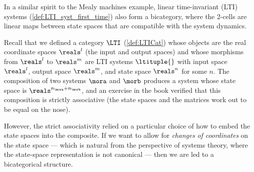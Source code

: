 \begin{example}
    \label{exa:bicat-lti}
    In a similar spirit to the Mealy machines example, linear time-invariant (LTI) systems (\cref{def:LTI_syst_first_time}) also form a bicategory, where the 2-cells are linear maps between state spaces that are compatible with the system dynamics.

    Recall that we defined a category $\LTI$ (\cref{def:LTICat}) whose objects are the real coordinate spaces $\reals^l$ (the input and output spaces) and whose morphisms from $\reals^l$ to $\reals^m$ are LTI systems $\ltituple{}$ with input space $\reals^l$, output space $\reals^m$, and state space $\reals^n$ for some $n$.
    The composition of two systems $\mora$ and $\morb$ produces a system whose state space is $\reals^{n_\mora + n_\morb}$, and an exercise in the book verified that this composition is strictly associative (the state spaces and the matrices work out to be equal on the nose).

    However, the strict associativity relied on a particular choice of how to embed the state spaces into the composite.
    If we want to allow for \emph{changes of coordinates} on the state space --- which is natural from the perspective of systems theory, where the state-space representation is not canonical --- then we are led to a bicategorical structure.


\end{example}
